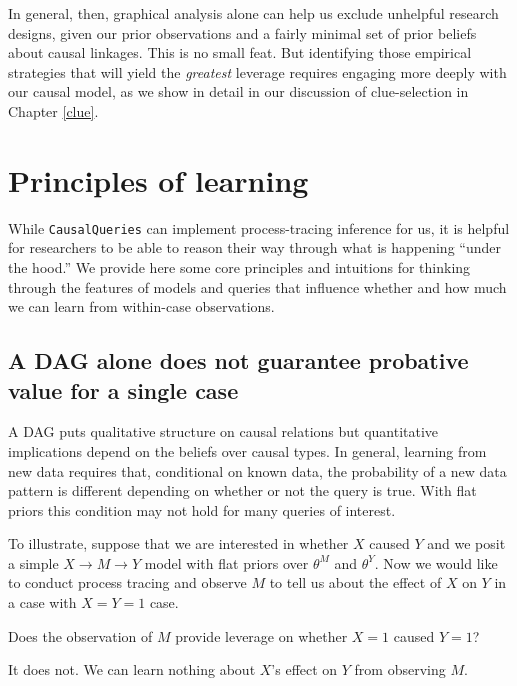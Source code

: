 \documentclass[
  12pt,
]{book}
\begin{document}
In general, then, graphical analysis alone can help us exclude unhelpful research designs, given our prior observations and a fairly minimal set of prior beliefs about causal linkages. This is no small feat. But identifying those empirical strategies that will yield the \emph{greatest} leverage requires engaging more deeply with our causal model, as we show in detail in our discussion of clue-selection in Chapter \ref{clue}.

\hypertarget{principles-of-learning}{%
\section{Principles of learning}\label{principles-of-learning}}

While \texttt{CausalQueries} can implement process-tracing inference for us, it is helpful for researchers to be able to reason their way through what is happening ``under the hood.'' We provide here some core principles and intuitions for thinking through the features of models and queries that influence whether and how much we can learn from within-case observations.

\hypertarget{a-dag-alone-does-not-guarantee-probative-value-for-a-single-case}{%
\subsection{A DAG alone does not guarantee probative value for a single case}\label{a-dag-alone-does-not-guarantee-probative-value-for-a-single-case}}

A DAG puts qualitative structure on causal relations but quantitative implications depend on the beliefs over causal types. In general, learning from new data requires that, conditional on known data, the probability of a new data pattern is different depending on whether or not the query is true. With flat priors this condition may not hold for many queries of interest.

To illustrate, suppose that we are interested in whether \(X\) caused \(Y\) and we posit a simple \(X \rightarrow M \rightarrow Y\) model with flat priors over \(\theta^M\) and \(\theta^Y\). Now we would like to conduct process tracing and observe \(M\) to tell us about the effect of \(X\) on \(Y\) in a case with \(X=Y=1\) case.

Does the observation of \(M\) provide leverage on whether \(X=1\) caused \(Y=1\)?

It does not. We can learn nothing about \(X\)'s effect on \(Y\) from observing \(M\).
\end{document}
